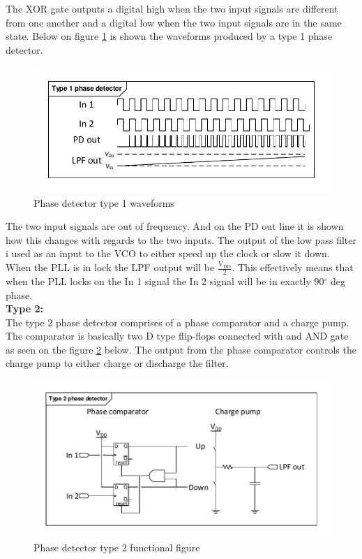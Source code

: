 The XOR gate outputs a digital high when the two input signals are different from one another and a digital low when the two input signals are in the same state. Below on figure \ref{fig:pd1_waveforms} is shown the waveforms produced by a type 1 phase detector.
\begin{figure}[H]
	\centering
	\includegraphics[width=.8\textwidth]{billeder/10technologystudies/PD1_waveforms}
	\caption{Phase detector type 1 waveforms}
	\label{fig:pd1_waveforms}
\end{figure}

The two input signals are out of frequency. And on the PD out line it is shown how this changes with regards to the two inputs.  The output of the low pass filter i used as an input to the VCO to either speed up the clock or slow it down.\\
When the PLL is in lock the LPF output will be $\frac{\text{V}_{\text{DD}}}{2}$. This effectively means that when the PLL locks on the In 1 signal the In 2 signal will be in exactly 90$^{\circ}$ deg phase.\\
\textbf{Type 2:}\\
The type 2 phase detector comprises of a phase comparator and a charge pump. The comparator is basically two D type flip-flops connected with and AND gate as seen on the figure \ref{fig:pd2_imp} below. The output from the phase comparator controls the charge pump to either charge or discharge the filter.

\begin{figure}[H]
	\centering
	\includegraphics[width=.7\textwidth]{billeder/10technologystudies/pd2_imp}
	\caption{Phase detector type 2 functional figure}
	\label{fig:pd2_imp}
\end{figure}

